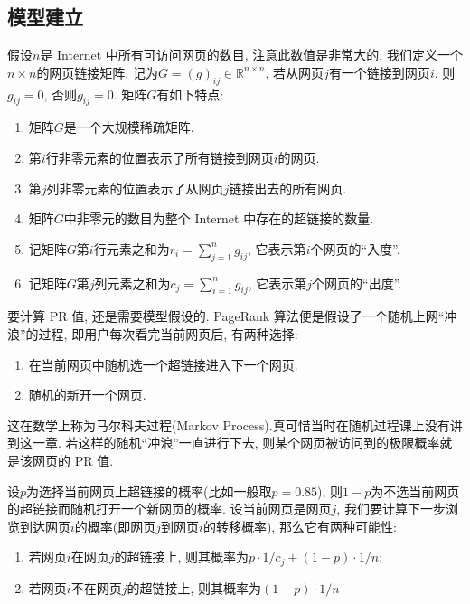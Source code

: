 \documentclass[a4paper,UTF8]{ctexart}
\theoremstyle{plain} \newtheorem{theorem}{定理}[section]
\theoremstyle{plain} \newtheorem{definition}{定义}[section]
\theoremstyle{plain} \newtheorem{lemma}{引理}[section]
\theoremstyle{plain} \newtheorem{proposition}{命题}[section]
\theoremstyle{plain} \newtheorem{example}{例}[section]
\theoremstyle{plain} \newtheorem{remark}{注}[section]
\theoremstyle{plain} \newtheorem{corollary}{推论}[section]
\begin{document}
\subsection{模型建立}
假设$n$是 Internet 中所有可访问网页的数目, 注意此数值是非常大的. 我们定义一个$n \times n$的网页链接矩阵, 记为$G = (g)_{ij} \in \mathbb{R}^{n \times n}$, 若从网页$j$有一个链接到网页$i$, 则$g_{ij} = 0$, 否则$g_{ij} = 0$. 矩阵$G$有如下特点:
\begin{enumerate}[(1)]
\item 矩阵$G$是一个大规模稀疏矩阵.

\item 第$i$行非零元素的位置表示了所有链接到网页$i$的网页.

\item 第$j$列非零元素的位置表示了从网页$j$链接出去的所有网页.

\item 矩阵$G$中非零元的数目为整个 Internet 中存在的超链接的数量.

\item 记矩阵$G$第$i$行元素之和为$r_{i} = \sum_{j=1}^{n} g_{ij}$, 它表示第$i$个网页的“入度”.

\item 记矩阵$G$第$j$列元素之和为$c_{j} = \sum_{i=1}^{n} g_{ij}$, 它表示第$j$个网页的“出度”.

\end{enumerate}


要计算 PR 值, 还是需要模型假设的. PageRank 算法便是假设了一个随机上网“冲浪”的过程, 即用户每次看完当前网页后, 有两种选择:
\begin{enumerate}[(1)]
\item 在当前网页中随机选一个超链接进入下一个网页.

\item 随机的新开一个网页.
\end{enumerate}

这在数学上称为马尔科夫过程(Markov Process).真可惜当时在随机过程课上没有讲到这一章. 若这样的随机“冲浪”一直进行下去, 则某个网页被访问到的极限概率就是该网页的 PR 值.

设$p$为选择当前网页上超链接的概率(比如一般取$p = 0.85$), 则$1 - p$为不选当前网页的超链接而随机打开一个新网页的概率. 设当前网页是网页$j$, 我们要计算下一步浏览到达网页$i$的概率(即网页$j$到网页$i$的转移概率), 那么它有两种可能性:
\begin{enumerate}[(1)]
\item 若网页$i$在网页$j$的超链接上, 则其概率为$p \cdot 1 / c_{j} + (1 - p) \cdot 1 / n$;

\item 若网页$i$不在网页$j$的超链接上, 则其概率为$(1 - p) \cdot 1 / n$
\end{enumerate}
\end{document}
